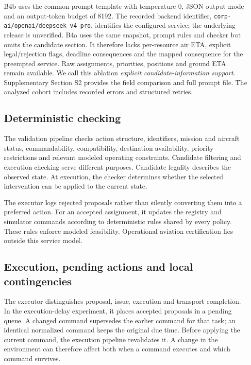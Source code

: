 \documentclass[]{interact}
\theoremstyle{plain}
\theoremstyle{definition}
\theoremstyle{remark}
\begin{document}
B4b uses the common prompt template with temperature 0, JSON output mode and an output-token budget of 8192. The recorded backend identifier, \nolinkurl{corp-ai/openai/deepseek-v4-pro}, identifies the configured service; the underlying release is unverified. B4a uses the same snapshot, prompt rules and checker but omits the candidate section. It therefore lacks per-resource air ETA, explicit legal/rejection flags, deadline consequences and the mapped consequence for the preempted service. Raw assignments, priorities, positions and ground ETA remain available. We call this ablation \emph{explicit candidate-information support}. Supplementary Section S2 provides the field comparison and full prompt file. The analyzed cohort includes recorded errors and structured retries.

\subsection{Deterministic checking}

The validation pipeline checks action structure, identifiers, mission and aircraft status, commandability, compatibility, destination availability, priority restrictions and relevant modeled operating constraints. Candidate filtering and execution checking serve different purposes. Candidate legality describes the observed state. At execution, the checker determines whether the selected intervention can be applied to the current state.

The executor logs rejected proposals rather than silently converting them into a preferred action. For an accepted assignment, it updates the registry and simulator commands according to deterministic rules shared by every policy. These rules enforce modeled feasibility. Operational aviation certification lies outside this service model.

\subsection{Execution, pending actions and local contingencies}

The executor distinguishes proposal, issue, execution and transport completion. In the execution-delay experiment, it places accepted proposals in a pending queue. A changed command supersedes the earlier command for that task; an identical normalized command keeps the original due time. Before applying the current command, the execution pipeline revalidates it. A change in the environment can therefore affect both when a command executes and which command survives.
\end{document}
